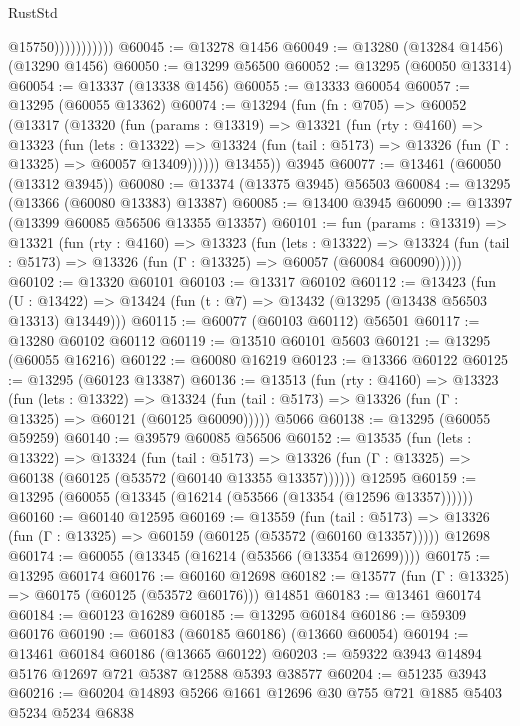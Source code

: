\begin{lexlean}{RustStd}
\begin{coremodule}
                          @15750)))))))))))
@60045 := @13278 @1456
@60049 := @13280 (@13284 @1456) (@13290 @1456)
@60050 := @13299 @56500
@60052 := @13295 (@60050 @13314)
@60054 := @13337 (@13338 @1456)
@60055 := @13333 @60054
@60057 := @13295 (@60055 @13362)
@60074 := @13294
    (fun (fn : @705) =>
    @60052
      (@13317
        (@13320
          (fun (params : @13319) =>
          @13321
            (fun (rty : @4160) =>
            @13323
              (fun (lets : @13322) =>
              @13324 (fun (tail : @5173) => @13326 (fun (Γ : @13325) => @60057 @13409))))))
        @13455))
    @3945
@60077 := @13461 (@60050 (@13312 @3945))
@60080 := @13374 (@13375 @3945) @56503
@60084 := @13295 (@13366 (@60080 @13383) @13387)
@60085 := @13400 @3945
@60090 := @13397 (@13399 @60085 @56506 @13355 @13357)
@60101 := fun (params : @13319) =>
  @13321
    (fun (rty : @4160) =>
    @13323
      (fun (lets : @13322) =>
      @13324 (fun (tail : @5173) => @13326 (fun (Γ : @13325) => @60057 (@60084 @60090)))))
@60102 := @13320 @60101
@60103 := @13317 @60102
@60112 := @13423
    (fun (U : @13422) => @13424 (fun (t : @7) => @13432 (@13295 (@13438 @56503 @13313) @13449)))
@60115 := @60077 (@60103 @60112) @56501
@60117 := @13280 @60102 @60112
@60119 := @13510 @60101 @5603
@60121 := @13295 (@60055 @16216)
@60122 := @60080 @16219
@60123 := @13366 @60122
@60125 := @13295 (@60123 @13387)
@60136 := @13513
    (fun (rty : @4160) =>
    @13323
      (fun (lets : @13322) =>
      @13324 (fun (tail : @5173) => @13326 (fun (Γ : @13325) => @60121 (@60125 @60090)))))
    @5066
@60138 := @13295 (@60055 @59259)
@60140 := @39579 @60085 @56506
@60152 := @13535
    (fun (lets : @13322) =>
    @13324
      (fun (tail : @5173) =>
      @13326 (fun (Γ : @13325) => @60138 (@60125 (@53572 (@60140 @13355 @13357))))))
    @12595
@60159 := @13295 (@60055 (@13345 (@16214 (@53566 (@13354 (@12596 @13357))))))
@60160 := @60140 @12595
@60169 := @13559
    (fun (tail : @5173) => @13326 (fun (Γ : @13325) => @60159 (@60125 (@53572 (@60160 @13357)))))
    @12698
@60174 := @60055 (@13345 (@16214 (@53566 (@13354 @12699))))
@60175 := @13295 @60174
@60176 := @60160 @12698
@60182 := @13577 (fun (Γ : @13325) => @60175 (@60125 (@53572 @60176))) @14851
@60183 := @13461 @60174
@60184 := @60123 @16289
@60185 := @13295 @60184
@60186 := @59309 @60176
@60190 := @60183 (@60185 @60186) (@13660 @60054)
@60194 := @13461 @60184 @60186 (@13665 @60122)
@60203 := @59322 @3943 @14894 @5176 @12697 @721 @5387 @12588 @5393 @38577
@60204 := @51235 @3943
@60216 := @60204 @14893 @5266 @1661 @12696 @30 @755 @721 @1885 @5403 @5234 @5234 @6838

\end{coremodule}
\end{lexlean}
